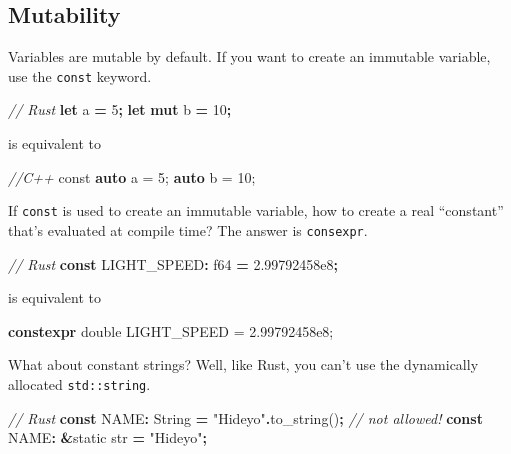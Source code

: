 \documentclass[
]{book}
\newenvironment{Shaded}{\begin{snugshade}}{\end{snugshade}}
\newcommand{\AttributeTok}[1]{\textcolor[rgb]{0.77,0.63,0.00}{#1}}
\newcommand{\CommentTok}[1]{\textcolor[rgb]{0.56,0.35,0.01}{\textit{#1}}}
\newcommand{\DataTypeTok}[1]{\textcolor[rgb]{0.13,0.29,0.53}{#1}}
\newcommand{\DecValTok}[1]{\textcolor[rgb]{0.00,0.00,0.81}{#1}}
\newcommand{\FloatTok}[1]{\textcolor[rgb]{0.00,0.00,0.81}{#1}}
\newcommand{\KeywordTok}[1]{\textcolor[rgb]{0.13,0.29,0.53}{\textbf{#1}}}
\newcommand{\NormalTok}[1]{#1}
\newcommand{\OperatorTok}[1]{\textcolor[rgb]{0.81,0.36,0.00}{\textbf{#1}}}
\newcommand{\OtherTok}[1]{\textcolor[rgb]{0.56,0.35,0.01}{#1}}
\newcommand{\StringTok}[1]{\textcolor[rgb]{0.31,0.60,0.02}{#1}}
\begin{document}
\hypertarget{mutability}{%
\subsection{Mutability}\label{mutability}}

Variables are mutable by default. If you want to create an immutable variable, use the \texttt{const} keyword.

\begin{Shaded}
\begin{Highlighting}[]
\CommentTok{// Rust}
\KeywordTok{let}\NormalTok{ a }\OperatorTok{=} \DecValTok{5}\OperatorTok{;}
\KeywordTok{let} \KeywordTok{mut}\NormalTok{ b }\OperatorTok{=} \DecValTok{10}\OperatorTok{;}
\end{Highlighting}
\end{Shaded}

is equivalent to

\begin{Shaded}
\begin{Highlighting}[]
\CommentTok{//C++}
\AttributeTok{const} \KeywordTok{auto}\NormalTok{ a = }\DecValTok{5}\NormalTok{;}
\KeywordTok{auto}\NormalTok{ b = }\DecValTok{10}\NormalTok{;}
\end{Highlighting}
\end{Shaded}

If \texttt{const} is used to create an immutable variable, how to create a real ``constant'' that's evaluated at compile time? The answer is \texttt{consexpr}.

\begin{Shaded}
\begin{Highlighting}[]
\CommentTok{// Rust}
\KeywordTok{const}\NormalTok{ LIGHT\_SPEED}\OperatorTok{:} \DataTypeTok{f64} \OperatorTok{=} \DecValTok{2.99792458e8}\OperatorTok{;}
\end{Highlighting}
\end{Shaded}

is equivalent to

\begin{Shaded}
\begin{Highlighting}[]
\KeywordTok{constexpr} \DataTypeTok{double}\NormalTok{ LIGHT\_SPEED = }\FloatTok{2.99792458e8}\NormalTok{;}
\end{Highlighting}
\end{Shaded}

What about constant strings? Well, like Rust, you can't use the dynamically allocated \texttt{std::string}.

\begin{Shaded}
\begin{Highlighting}[]
\CommentTok{// Rust}
\KeywordTok{const}\NormalTok{ NAME}\OperatorTok{:} \DataTypeTok{String} \OperatorTok{=} \StringTok{"Hideyo"}\OperatorTok{.}\NormalTok{to\_string()}\OperatorTok{;} \CommentTok{// not allowed!}
\KeywordTok{const}\NormalTok{ NAME}\OperatorTok{:} \OperatorTok{\&}\OtherTok{\textquotesingle{}static} \DataTypeTok{str} \OperatorTok{=} \StringTok{"Hideyo"}\OperatorTok{;}
\end{Highlighting}
\end{Shaded}
\end{document}
